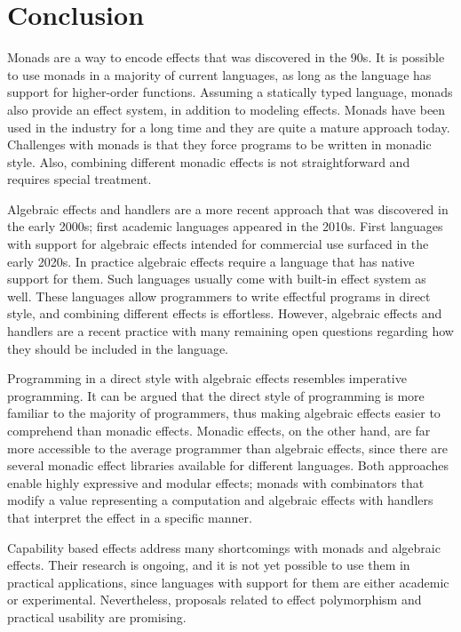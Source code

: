 \chapter{Conclusion}
Monads are a way to encode effects that was discovered in the 90s. It is possible to use monads in a majority of current languages, as long as the language has support for higher-order functions. Assuming a statically typed language, monads also provide an effect system, in addition to modeling effects. Monads have been used in the industry for a long time and they are quite a mature approach today. Challenges with monads is that they force programs to be written in monadic style. Also, combining different monadic effects is not straightforward and requires special treatment.

Algebraic effects and handlers are a more recent approach that was discovered in the early 2000s; first academic languages appeared in the 2010s. First languages with support for algebraic effects intended for commercial use surfaced in the early 2020s. In practice algebraic effects require a language that has native support for them. Such languages usually come with built-in effect system as well. These languages allow programmers to write effectful programs in direct style, and combining different effects is effortless. However, algebraic effects and handlers are a recent practice with many remaining open questions regarding how they should be included in the language.

Programming in a direct style with algebraic effects resembles imperative programming. It can be argued that the direct style of programming is more familiar to the majority of programmers, thus making algebraic effects easier to comprehend than monadic effects. Monadic effects, on the other hand, are far more accessible to the average programmer than algebraic effects, since there are several monadic effect libraries available for different languages. Both approaches enable highly expressive and modular effects; monads with combinators that modify a value representing a computation and algebraic effects with handlers that interpret the effect in a specific manner.

Capability based effects address many shortcomings with monads and algebraic effects. Their research is ongoing, and it is not yet possible to use them in practical applications, since languages with support for them are either academic or experimental. Nevertheless, proposals related to effect polymorphism and practical usability are promising.

